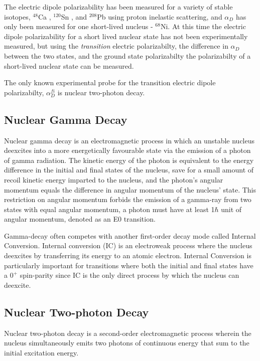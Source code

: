 \documentclass[cnatzke_thesis_proposal.tex]{subfiles}
\begin{document}
The electric dipole polarizability has been measured for a variety of stable isotopes, $^{48}$Ca \cite{Birkhan2017}, $^{120}$Sn \cite{Hashimoto2015}, and $^{208}$Pb \cite{Tamii2011} using proton inelastic scattering, and $\alpha_D$ has only been measured for one short-lived nucleus - $^{68}$Ni. \cite{Rossi2013}
At this time the electric dipole polarizability for a short lived nuclear state has not been experimentally measured, but using the \textit{transition} electric polarizabilty, the difference in $\alpha_D$ between the two states, and the ground state polarizabilty the polarizabilty of a short-lived nuclear state can be measured.

The only known experimental probe for the transition electric dipole polarizabilty, $\alpha_D^{fi}$ is nuclear two-photon decay.

\subsection{Nuclear Gamma Decay}
Nuclear gamma decay is an electromagnetic process in which an unstable nucleus deexcites into a more energetically favourable state via the emission of a photon of gamma radiation. The kinetic energy of the photon is equivalent to the energy difference in the initial and final states of the nucleus, save for a small amount of recoil kinetic energy imparted to the nucleus, and the photon's angular momentum equals the difference in angular momentum of the nucleus' state. This restriction on angular momentum forbids the emission of a gamma-ray from two states with equal angular momentum, a photon must have at least 1$\hbar$ unit of angular momentum, denoted as an E0 transition.

Gamma-decay often competes with another first-order decay mode called Internal Conversion. Internal conversion (IC) is an electroweak process where the nucleus deexcites by transferring its energy to an atomic electron. Internal Conversion is particularly important for transitions where both the initial and final states have a $0^+$ spin-parity since IC is the only direct process by which the nucleus can deexcite. \cite{Krane1988}

\subsection{Nuclear Two-photon Decay}

Nuclear two-photon decay is a second-order electromagnetic process wherein the nucleus simultaneously emits two photons of continuous energy that sum to the initial excitation energy. \cite{Kramp1987}

\end{document}
